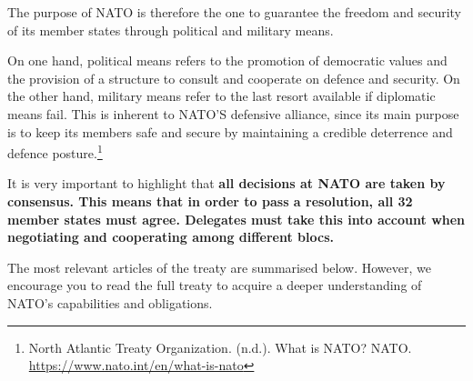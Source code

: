The purpose of NATO is therefore the one to guarantee the freedom and security of its member states through political and military means.

On one hand, political means refers to the promotion of democratic values and the provision of a structure to consult and cooperate on defence and security. On the other hand, military means refer to the last resort available if diplomatic means fail. This is inherent to NATO’S defensive alliance, since its main purpose is to keep its members safe and secure by maintaining a credible deterrence and defence posture.\footnote{North Atlantic Treaty Organization. (n.d.). What is NATO? NATO. \url{https://www.nato.int/en/what-is-nato}}

It is very important to highlight that \textbf{all decisions at NATO are taken by consensus. This means that in order to pass a resolution, all 32 member states must agree. Delegates must take this into account when negotiating and cooperating among different blocs.}

The most relevant articles of the treaty are summarised below. However, we encourage you to read the full treaty to acquire a deeper understanding of NATO’s capabilities and obligations.

